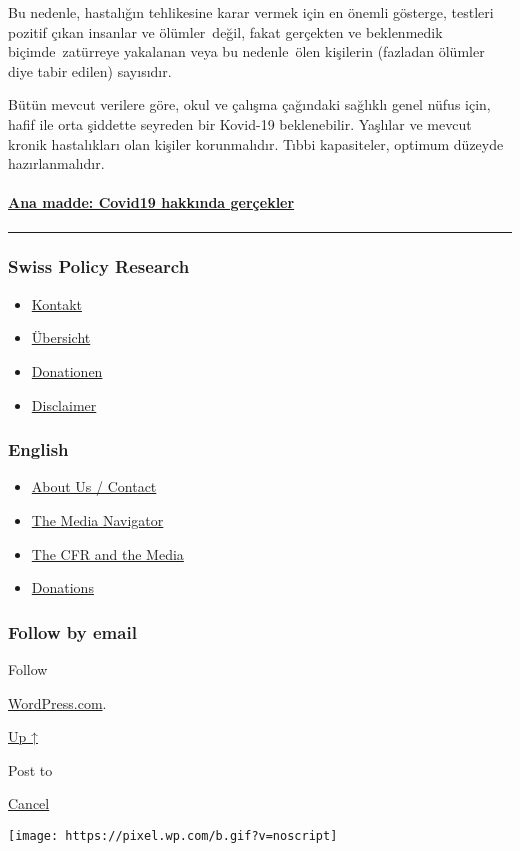 Bu nedenle, hastalığın tehlikesine karar vermek için en önemli gösterge,
testleri pozitif çıkan insanlar ve ölümler~değil, fakat gerçekten ve
beklenmedik biçimde~zatürreye yakalanan veya bu nedenle~ölen kişilerin
(fazladan ölümler diye tabir edilen) sayısıdır.

Bütün mevcut verilere göre, okul ve çalışma çağındaki sağlıklı genel
nüfus için, hafif ile orta şiddette seyreden bir Kovid-19 beklenebilir.
Yaşlılar ve mevcut kronik hastalıkları olan kişiler korunmalıdır. Tıbbi
kapasiteler, optimum düzeyde hazırlanmalıdır.

\hypertarget{ana-madde-covid19-hakkux131nda-geruxe7ekler-1}{%
\paragraph{\texorpdfstring{\href{https://swprs.org/a-swiss-doctor-on-covid-19/}{Ana
madde: Covid19 hakkında
gerçekler}}{Ana madde: Covid19 hakkında gerçekler}}\label{ana-madde-covid19-hakkux131nda-geruxe7ekler-1}}

\begin{center}\rule{0.5\linewidth}{\linethickness}\end{center}

\hypertarget{swiss-policy-research}{%
\subsubsection{Swiss Policy Research}\label{swiss-policy-research}}

\begin{itemize}
\tightlist
\item
  \href{https://swprs.org/kontakt/}{Kontakt}
\item
  \href{https://swprs.org/uebersicht/}{Übersicht}
\item
  \href{https://swprs.org/donationen/}{Donationen}
\item
  \href{https://swprs.org/disclaimer/}{Disclaimer}
\end{itemize}

\hypertarget{english}{%
\subsubsection{English}\label{english}}

\begin{itemize}
\tightlist
\item
  \href{https://swprs.org/contact/}{About Us / Contact}
\item
  \href{https://swprs.org/media-navigator/}{The Media Navigator}
\item
  \href{https://swprs.org/the-american-empire-and-its-media/}{The CFR
  and the Media}
\item
  \href{https://swprs.org/donations/}{Donations}
\end{itemize}

\hypertarget{follow-by-email}{%
\subsubsection{Follow by email}\label{follow-by-email}}

Follow

\href{https://wordpress.com/?ref=footer_custom_com}{WordPress.com}.

\protect\hyperlink{}{Up ↑}

Post to

\protect\hyperlink{}{Cancel}

\texttt{[image: https://pixel.wp.com/b.gif?v=noscript]}

